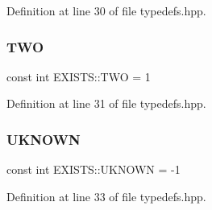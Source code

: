 Definition at line 30 of file typedefs.\+hpp.

\mbox{\label{namespace_e_x_i_s_t_s_ad76d02e8eb6d20715d333b72394b0648}} 
\subsubsection{\texorpdfstring{T\+WO}{TWO}}
{\footnotesize\ttfamily const int E\+X\+I\+S\+T\+S\+::\+T\+WO = 1}



Definition at line 31 of file typedefs.\+hpp.

\mbox{\label{namespace_e_x_i_s_t_s_a81eb362d951445c658942a433afddb97}} 
\subsubsection{\texorpdfstring{U\+K\+N\+O\+WN}{UKNOWN}}
{\footnotesize\ttfamily const int E\+X\+I\+S\+T\+S\+::\+U\+K\+N\+O\+WN = -\/1}



Definition at line 33 of file typedefs.\+hpp.

